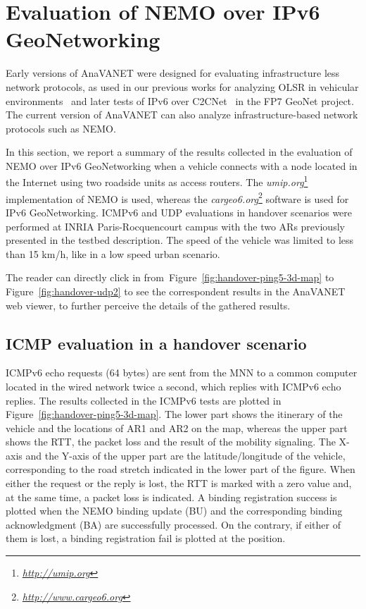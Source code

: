\documentclass[fonts]{icst}
\begin{document}
\section{Evaluation of NEMO over IPv6 GeoNetworking} 
\label{lbl:evaluation} 

Early versions of AnaVANET were designed for evaluating infrastructure less
network protocols, as used in our previous works for
analyzing OLSR in vehicular environments~\cite{Santa2009a} and later tests of IPv6 over C2CNet~\cite{Tsukada2010b} in the FP7 GeoNet project. The current version of AnaVANET can also analyze infrastructure-based network
protocols such as NEMO. 

In this section, we report a summary of the results collected in the evaluation
of NEMO over IPv6 GeoNetworking when a vehicle connects with a node located in
the Internet using two roadside units as access routers. The
\textit{umip.org}\footnote{\textit{\href{http://umip.org}{http://umip.org}}}
implementation of NEMO is used, whereas the
\textit{cargeo6.org}\footnote{\textit{\href{http://www.cargeo6.org}{http://www.cargeo6.org}}}
software is used for IPv6 GeoNetworking. ICMPv6 and UDP evaluations in handover
scenarios were performed at INRIA Paris-Rocquencourt campus with the two ARs
previously presented in the testbed description. The speed of the vehicle was
limited to less than 15 km/h, like in a low speed urban scenario. 

The reader can directly click in from~Figure~\ref{fig:handover-ping5-3d-map} to
Figure~\ref{fig:handover-udp2} to see the correspondent results in the AnaVANET
web viewer, to further perceive the details of the gathered results. 

\subsection{ICMP evaluation in a handover scenario}

ICMPv6 echo requests (64 bytes) are sent from the MNN to a common computer
located in the wired network twice a second, which replies with ICMPv6 echo
replies. The results collected in the ICMPv6 tests are plotted in
Figure~\ref{fig:handover-ping5-3d-map}. The lower part shows the itinerary of
the vehicle and the locations of AR1 and AR2 on the map, whereas the upper part
shows the RTT, the packet loss and the result of the mobility signaling. The
X-axis and the Y-axis of the upper part are the latitude/longitude of
the vehicle, corresponding to the road stretch indicated in the lower part of
the figure. When either the request or the reply is lost, the RTT is marked with
a zero value and, at the same time, a packet loss is indicated. A binding
registration success is plotted when the NEMO binding update (BU) and the
corresponding binding acknowledgment (BA) are successfully processed. On the
contrary, if either of them is lost, a binding registration fail is plotted at
the position.
\end{document}
